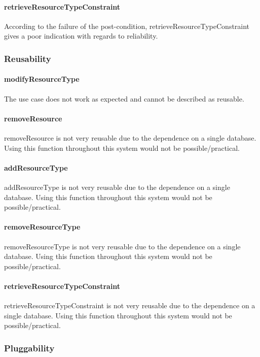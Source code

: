 \documentclass[a4paper]{article}
\begin{document}
\paragraph{retrieveResourceTypeConstraint}
According to the failure of the post-condition, retrieveResourceTypeConstraint gives a poor indication with regards to reliability.

\subsubsection {Reusability}

\paragraph{modifyResourceType}
The use case does not work as expected and cannot be described as reusable.

\paragraph{removeResource}
removeResource is not very reusable due to the dependence on a single database. Using this function throughout this system would not be possible/practical.

\paragraph{addResourceType}
addResourceType is not very reusable due to the dependence on a single database. Using this function throughout this system would not be possible/practical.

\paragraph{removeResourceType}
removeResourceType is not very reusable due to the dependence on a single database. Using this function throughout this system would not be possible/practical.

\paragraph{retrieveResourceTypeConstraint}
retrieveResourceTypeConstraint is not very reusable due to the dependence on a single database. Using this function throughout this system would not be possible/practical.

\subsubsection {Pluggability}
\end{document}
